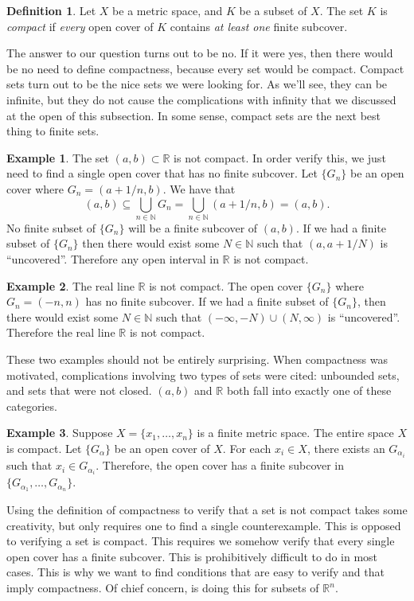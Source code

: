 \documentclass{article}
\newcommand{\N}{\mathbb{N}}
\newcommand{\R}{\mathbb{R}}
\theoremstyle{definition}
\newtheorem{definition}{Definition}[section]
\newtheorem{example}{Example}[section]
\begin{document}
\begin{definition}
	Let $ X $ be a metric space, and $ K $ be a subset of $ X $. The set $ K $ is \textit{\color{red}compact} if \textit{every} open cover of $ K $ contains \textit{at least one} finite subcover. 
\end{definition} 
The answer to our question turns out to be no. If it were yes, then there would be no need to define compactness, because every set would be compact. Compact sets turn out to be the nice sets we were looking for. As we'll see, they can be infinite, but they do not cause the complications with infinity that we discussed at the open of this subsection. In some sense, compact sets are the next best thing to finite sets. 
\begin{example}
	The set $ (a,b)\subset\R $ is not compact. In order verify this, we just need to find a single open cover that has no finite subcover. Let $ \{G_n\} $ be an open cover where $ G_n=(a+1/n,b) $. We have that $$ (a,b)\subseteq\bigcup_{n\in \N} G_n=\bigcup_{n\in \N}(a+1/n,b)=(a,b).$$ No finite subset of $ \{G_n\} $ will be a finite subcover of $ (a,b) $. If we had a finite subset of $ \{G_n\} $ then there would exist some $ N\in\N $ such that $ (a,a+1/N) $ is ``uncovered''. Therefore any open interval in $ \R $ is not compact. 
\end{example}
\begin{example}
	The real line $ \R $ is not compact. The open cover $ \{G_n\} $ where $ G_n=(-n,n) $ has no finite subcover. If we had a finite subset of $ \{G_n\} $, then there would exist some $ N\in\N $ such that $ (-\infty,-N)\cup(N,\infty) $ is ``uncovered''. Therefore the real line $ \R $ is not compact. 
\end{example}

These two examples should not be entirely surprising. When compactness was motivated, complications involving two types of sets were cited: unbounded sets, and sets that were not closed. $ (a,b) $ and $ \R $ both fall into exactly one of these categories.
\begin{example}
	Suppose $ X=\{x_1,\ldots,x_n\} $ is a finite metric space. The entire space $ X $ is compact. Let $ \{G_\alpha\} $ be an open cover of $ X $. For each $ x_i\in X $, there exists an $ G_{\alpha_i} $ such that $ x_i\in G_{\alpha_i} $. Therefore, the open cover has a finite subcover in $ \{G_{\alpha_1},\ldots ,G_{\alpha_n}\} $.    
\end{example}
Using the definition of compactness to verify that a set is not compact takes some creativity, but only requires one to find a single counterexample. This is opposed to verifying a set is compact. This requires we somehow verify that every single open cover has a finite subcover. This is prohibitively difficult to do in most cases. This is why we want to find conditions that are easy to verify and that imply compactness. Of chief concern, is doing this for subsets of $ \R^n $. 
\end{document}

